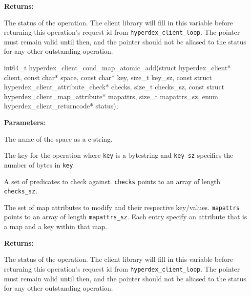 \noindent\textbf{Returns:}
\begin{description}[labelindent=\widthof{{\texttt{status}}},leftmargin=*,noitemsep,nolistsep,align=right]
\item[\texttt{status}] The status of the operation.  The client library will fill in this variable before returning this operation's request id from \texttt{hyperdex\_client\_loop}.  The pointer must remain valid until then, and the pointer should not be aliased to the status for any other outstanding operation.
\end{description}

\funcsep
\begin{ccode}
int64_t hyperdex_client_cond_map_atomic_add(struct hyperdex_client* client,
                const char* space,
                const char* key, size_t key_sz,
                const struct hyperdex_client_attribute_check* checks, size_t checks_sz,
                const struct hyperdex_client_map_attribute* mapattrs, size_t mapattrs_sz,
                enum hyperdex_client_returncode* status);
\end{ccode}
\funcdesc 

\noindent\textbf{Parameters:}
\begin{description}[labelindent=\widthof{{\texttt{mapattrs}, \texttt{mapattrs\_sz}}},leftmargin=*,noitemsep,nolistsep,align=right]
\item[\texttt{space}] The name of the space as a c-string.
\item[\texttt{key}, \texttt{key\_sz}] The key for the operation where \texttt{key} is a bytestring and \texttt{key\_sz} specifies the number of bytes in \texttt{key}.
\item[\texttt{checks}, \texttt{checks\_sz}] A set of predicates to check against.  \texttt{checks} points to an array of length \texttt{checks\_sz}.
\item[\texttt{mapattrs}, \texttt{mapattrs\_sz}] The set of map attributes to modify and their respective key/values.  \texttt{mapattrs} points to an array of length \texttt{mapattrs\_sz}.  Each entry specify an attribute that is a map and a key within that map.
\end{description}

\noindent\textbf{Returns:}
\begin{description}[labelindent=\widthof{{\texttt{status}}},leftmargin=*,noitemsep,nolistsep,align=right]
\item[\texttt{status}] The status of the operation.  The client library will fill in this variable before returning this operation's request id from \texttt{hyperdex\_client\_loop}.  The pointer must remain valid until then, and the pointer should not be aliased to the status for any other outstanding operation.
\end{description}

